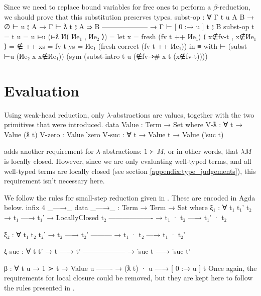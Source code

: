 \documentclass[logo,bsc,singlespacing,parskip,online]{infthesis}
\renewenvironment{code}{\mintedcopy[breaklines,breaksymbolleft=\;]{agda}}{\endmintedcopy}
\begin{document}
Since we need to replace bound variables for free ones to perform a $\beta$-reduction, we should
prove that this substitution preserves types.
\begin{code}
  subst-op : ∀ {Γ t u A B}
    → ∅ ⊢ u ⦂ A
    → Γ ⊢ ƛ t ⦂ A ⇒ B
      --------------------
    → Γ ⊢ [ 0 :→ u ] t ⦂ B
  subst-op {t = t} {u = u} ⊢u (⊢ƛ И⟨ Иe₁ , Иe₂ ⟩) =
    let x                  = fresh (fv t ++ Иe₁)
        ⟨ x∉fv-t , x∉Иe₁ ⟩ = ∉-++ {xs = fv t} {ys = Иe₁}
                                (fresh-correct (fv t ++ Иe₁))
    in ≡-with-⊢ (subst ⊢u (Иe₂ x {x∉Иe₁}))
      (sym (subst-intro t u (∉fv⇒# x t (x∉fv-t))))
\end{code}

\section{Evaluation}
Using weak-head reduction, only $\lambda$-abstractions are values, together with the two primitives
that were introduced.
\begin{code}
  data Value : Term → Set where
    V-ƛ : ∀ {t} → Value (ƛ t)
    V-zero : Value ‵zero
    V-suc : ∀ {t} → Value t → Value (‵suc t)
\end{code}

\citet{chargueraud_locally_2012} adds another requirement for $\lambda$-abstractions: $1 \succ M$,
or in other words, that $\lambda M$ is locally closed. However, since we are only evaluating
well-typed terms, and all well-typed terms are locally closed (see section
\ref{appendix:type_judgements}), this requirement isn't necessary here.

We follow the rules for small-step reduction given in \citet{chargueraud_locally_2012}. These are
encoded in Agda below.
\begin{code}
  infix 4 _—→_
  data _—→_ : Term → Term → Set where
    ξ₁ : ∀ {t₁ t₁' t₂}
      → t₁ —→ t₁'
      → LocallyClosed t₂
        -------------------
      → t₁ · t₂ —→ t₁' · t₂

    ξ₂ : ∀ {t₁ t₂ t₂'}
      → t₂ —→ t₂'
        ---------
      → t₁ · t₂ —→ t₁ · t₂'

    ξ-suc : ∀ {t t'}
      → t —→ t'
        ------------------
      → ‵suc t —→ ‵suc t'

    β : ∀ {t u}
      → 1 ≻ t
      → Value u
        -------
      → (ƛ t) · u —→ [ 0 :→ u ] t
\end{code}
Once again, the requirements for local closure could be removed, but they are kept here to follow
the rules presented in \citet{chargueraud_locally_2012}.
\end{document}
